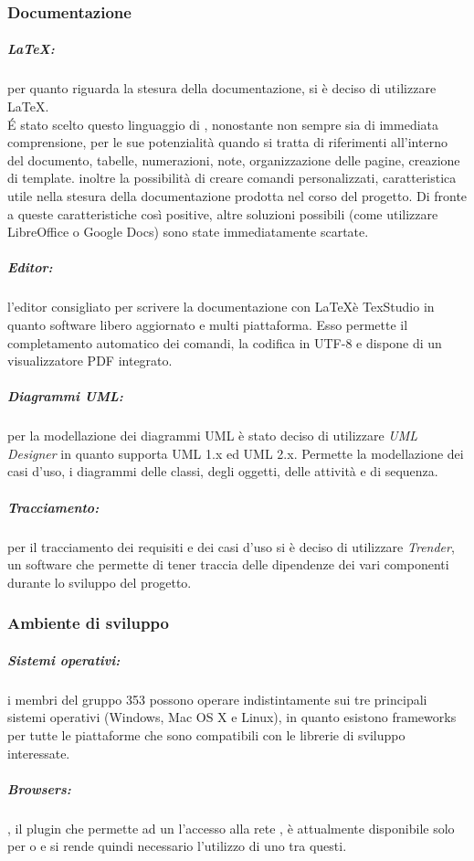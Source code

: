 	\subsubsection{Documentazione}
	\subparagraph{\LaTeX:} per quanto riguarda la stesura della documentazione, si è deciso di utilizzare \LaTeX. \\
		\'{E}	stato scelto questo linguaggio di , nonostante
		non sempre sia di immediata comprensione, per le sue potenzialità quando
		si tratta di riferimenti all'interno del documento, tabelle, numerazioni,
		note, organizzazione delle pagine, creazione di template. inoltre
		la possibilità di creare comandi personalizzati, caratteristica utile nella
		stesura della documentazione prodotta nel corso del progetto. Di fronte a
		queste caratteristiche così positive, altre soluzioni possibili (come utilizzare
		LibreOffice o Google Docs) sono state immediatamente scartate.
	\subparagraph{Editor:} l'editor consigliato per scrivere la documentazione con \LaTeX è
		TexStudio in quanto software libero aggiornato e multi piattaforma. Esso
		permette il completamento automatico dei comandi, la codifica in UTF-8 e
		dispone di un visualizzatore PDF integrato.
	\subparagraph{Diagrammi UML:} per la modellazione dei diagrammi UML è stato deciso di utilizzare 	\emph{UML Designer} in quanto supporta UML 1.x ed UML 2.x. Permette la modellazione dei casi d'uso, i 	diagrammi delle classi, degli oggetti, delle attività	e di sequenza.
	\subparagraph{Tracciamento:} per il tracciamento dei requisiti e dei casi d'uso si è deciso di utilizzare \emph{Trender}, un software che permette di tener traccia delle dipendenze dei vari componenti durante lo sviluppo del progetto.
	
	\subsubsection{Ambiente di sviluppo}
	\subparagraph{Sistemi operativi:} i membri del gruppo 353 possono operare indistintamente sui tre principali sistemi operativi (Windows, Mac OS X e Linux), in quanto esistono frameworks per tutte le piattaforme che sono compatibili con le librerie di sviluppo interessate.
	\subparagraph{Browsers:} , il plugin che permette ad un  l'accesso alla rete , è attualmente disponibile solo per  o  e si rende quindi necessario l'utilizzo di uno tra questi.
